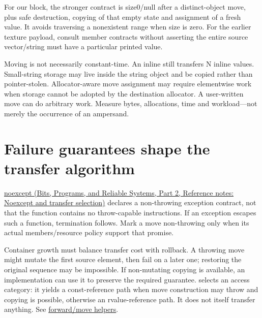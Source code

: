 For our block, the stronger contract is size0/null after a distinct-object move, plus safe destruction, copying of that empty state and assignment of a fresh value. It avoids traversing a nonexistent range when size is zero. For the earlier texture payload, consult member contracts without asserting the entire source vector/string must have a particular printed value.

Moving is not necessarily constant-time. An inline  still transfers N inline values. Small-string storage may live inside the string object and be copied rather than pointer-stolen. Allocator-aware move assignment may require elementwise work when storage cannot be adopted by the destination allocator. A user-written move can do arbitrary work. Measure bytes, allocations, time and workload---not merely the occurrence of an ampersand.

\section{Failure guarantees shape the transfer algorithm}\label{05-engine-i-ch003-failure-guarantees-shape-the-transfer-algorithm}

\hypertarget{05-engine-i-ch003-failure-guarantees-shape-the-transfer-algorithm}{}

\href{../01-Bits-Programs-and-Reliable-Systems-P02/main.pdf\#nameddest=appendix-c746afaa47d1}{noexcept (Bits, Programs, and Reliable Systems, Part 2, Reference notes: Noexcept and transfer selection)} declares a non-throwing exception contract, not that the function contains no throw-capable instructions. If an exception escapes such a function, termination follows. Mark a move non-throwing only when its actual members/resource policy support that promise.

Container growth must balance transfer cost with rollback. A throwing move might mutate the first source element, then fail on a later one; restoring the original sequence may be impossible. If non-mutating copying is available, an implementation can use it to preserve the required guarantee.  selects an access category: it yields a const-reference path when move construction may throw and copying is possible, otherwise an rvalue-reference path. It does not itself transfer anything. See \href{https://eel.is/c++draft/forward}{forward/move helpers}.

